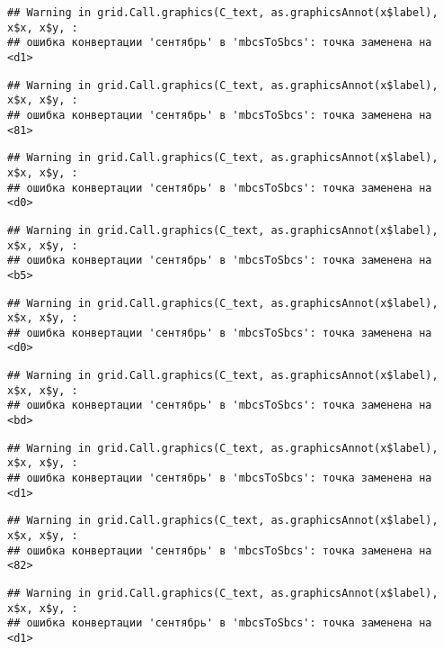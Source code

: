 \documentclass[
]{article}
\begin{document}
\begin{verbatim}
## Warning in grid.Call.graphics(C_text, as.graphicsAnnot(x$label), x$x, x$y, :
## ошибка конвертации 'сентябрь' в 'mbcsToSbcs': точка заменена на <d1>
\end{verbatim}

\begin{verbatim}
## Warning in grid.Call.graphics(C_text, as.graphicsAnnot(x$label), x$x, x$y, :
## ошибка конвертации 'сентябрь' в 'mbcsToSbcs': точка заменена на <81>
\end{verbatim}

\begin{verbatim}
## Warning in grid.Call.graphics(C_text, as.graphicsAnnot(x$label), x$x, x$y, :
## ошибка конвертации 'сентябрь' в 'mbcsToSbcs': точка заменена на <d0>
\end{verbatim}

\begin{verbatim}
## Warning in grid.Call.graphics(C_text, as.graphicsAnnot(x$label), x$x, x$y, :
## ошибка конвертации 'сентябрь' в 'mbcsToSbcs': точка заменена на <b5>
\end{verbatim}

\begin{verbatim}
## Warning in grid.Call.graphics(C_text, as.graphicsAnnot(x$label), x$x, x$y, :
## ошибка конвертации 'сентябрь' в 'mbcsToSbcs': точка заменена на <d0>
\end{verbatim}

\begin{verbatim}
## Warning in grid.Call.graphics(C_text, as.graphicsAnnot(x$label), x$x, x$y, :
## ошибка конвертации 'сентябрь' в 'mbcsToSbcs': точка заменена на <bd>
\end{verbatim}

\begin{verbatim}
## Warning in grid.Call.graphics(C_text, as.graphicsAnnot(x$label), x$x, x$y, :
## ошибка конвертации 'сентябрь' в 'mbcsToSbcs': точка заменена на <d1>
\end{verbatim}

\begin{verbatim}
## Warning in grid.Call.graphics(C_text, as.graphicsAnnot(x$label), x$x, x$y, :
## ошибка конвертации 'сентябрь' в 'mbcsToSbcs': точка заменена на <82>
\end{verbatim}

\begin{verbatim}
## Warning in grid.Call.graphics(C_text, as.graphicsAnnot(x$label), x$x, x$y, :
## ошибка конвертации 'сентябрь' в 'mbcsToSbcs': точка заменена на <d1>
\end{verbatim}
\end{document}
